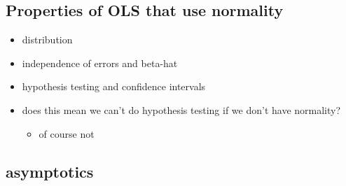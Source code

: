 \subsection{Properties of OLS that use normality}
\label{sec-1-2}

\begin{itemize}
\item distribution
\item independence of errors and beta-hat
\item hypothesis testing and confidence intervals
\item does this mean we can't do hypothesis testing if we don't have
       normality?
\begin{itemize}
\item of course not
\end{itemize}
\end{itemize}
\subsection{asymptotics}
\label{sec-1-3}

